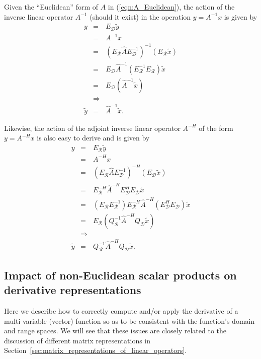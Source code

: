 Given the ``Euclidean'' form of $A$ in (\ref{eqn:A_Euclidean}), the action of
the inverse linear operator $A^{-1}$ (should it exist) in the operation $y =
A^{-1} x$ is given by
%
\begin{eqnarray}
y
& = & E_{\mathcal{D}} \tilde{y} \nonumber \\
& = & A^{-1} x \nonumber \\
& = & (E_{\mathcal{R}} \hat{A} E_{\mathcal{D}}^{-1})^{-1} (E_{\mathcal{R}} \tilde{x}) \nonumber \\
& = & E_{\mathcal{D}} \hat{A}^{-1} (E_{\mathcal{R}}^{-1} E_{\mathcal{R}}) \tilde{x}  \nonumber \\
& = & E_{\mathcal{D}} ( \hat{A}^{-1} \tilde{x} ) \nonumber \\
& \Rightarrow &  \nonumber \\
\tilde{y} & = & \hat{A}^{-1} \tilde{x}.
\label{eqn:A_Euclidean_matrix_inverse_apply}
\end{eqnarray}
%

Likewise, the action of the adjoint inverse linear operator $A^{-H}$ of the
form $y = A^{-H} x$ is also easy to derive and is given by
%
\begin{eqnarray}
y
& = & E_{\mathcal{R}} \tilde{y} \nonumber \\
& = & A^{-H} x \nonumber \\
& = & (E_{\mathcal{R}} \hat{A} E_{\mathcal{D}}^{-1})^{-H} (E_{\mathcal{D}} \tilde{x}) \nonumber \\
& = & E_{\mathcal{R}}^{-H} \hat{A}^{-H} E_{\mathcal{D}}^H E_{\mathcal{D}} \tilde{x}  \nonumber \\
& = & ( E_{\mathcal{R}} E_{\mathcal{R}}^{-1} ) E_{\mathcal{R}}^{-H} \hat{A}^{-H} ( E_{\mathcal{D}}^H E_{\mathcal{D}} ) \tilde{x}  \nonumber \\
& = & E_{\mathcal{R}} ( Q_{\mathcal{R}}^{-1} \hat{A}^{-H} Q_{\mathcal{D}} \tilde{x} ) \nonumber \\
& \Rightarrow &  \nonumber \\
\tilde{y} & = & Q_{\mathcal{R}}^{-1} \hat{A}^{-H} Q_{\mathcal{D}} \tilde{x}.
\label{eqn:A_Euclidean_matrix_adjoint_inverse_apply}
\end{eqnarray}
%

\subsection{Impact of non-Euclidean scalar products on derivative representations}

Here we describe how to correctly compute and/or apply the derivative of a
multi-variable (vector) function so as to be consistent with the function's
domain and range spaces.  We will see that these issues are closely related to
the discussion of different matrix representations in
Section~\ref{sec:matrix_representations_of_linear_operators}.

